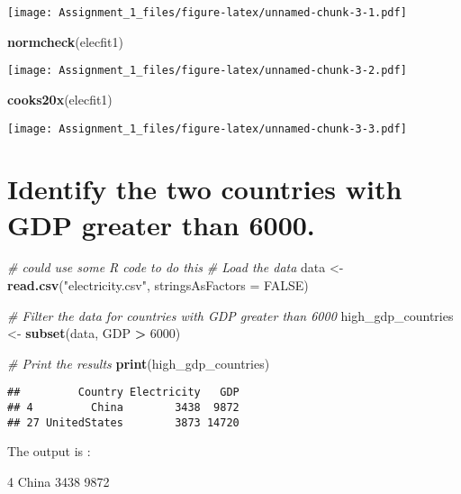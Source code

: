 \documentclass[
]{article}
\newenvironment{Shaded}{\begin{snugshade}}{\end{snugshade}}
\newcommand{\AttributeTok}[1]{\textcolor[rgb]{0.13,0.29,0.53}{#1}}
\newcommand{\CommentTok}[1]{\textcolor[rgb]{0.56,0.35,0.01}{\textit{#1}}}
\newcommand{\ConstantTok}[1]{\textcolor[rgb]{0.56,0.35,0.01}{#1}}
\newcommand{\DecValTok}[1]{\textcolor[rgb]{0.00,0.00,0.81}{#1}}
\newcommand{\FunctionTok}[1]{\textcolor[rgb]{0.13,0.29,0.53}{\textbf{#1}}}
\newcommand{\NormalTok}[1]{#1}
\newcommand{\OtherTok}[1]{\textcolor[rgb]{0.56,0.35,0.01}{#1}}
\newcommand{\SpecialCharTok}[1]{\textcolor[rgb]{0.81,0.36,0.00}{\textbf{#1}}}
\newcommand{\StringTok}[1]{\textcolor[rgb]{0.31,0.60,0.02}{#1}}
\begin{document}
\texttt{[image: Assignment\_1\_files/figure-latex/unnamed-chunk-3-1.pdf]}

\begin{Shaded}
\begin{Highlighting}[]
\FunctionTok{normcheck}\NormalTok{(elecfit1)}
\end{Highlighting}
\end{Shaded}

\texttt{[image: Assignment\_1\_files/figure-latex/unnamed-chunk-3-2.pdf]}

\begin{Shaded}
\begin{Highlighting}[]
\FunctionTok{cooks20x}\NormalTok{(elecfit1)}
\end{Highlighting}
\end{Shaded}

\texttt{[image: Assignment\_1\_files/figure-latex/unnamed-chunk-3-3.pdf]}

\section{Identify the two countries with GDP greater than
6000.}\label{identify-the-two-countries-with-gdp-greater-than-6000.}

\begin{Shaded}
\begin{Highlighting}[]
\CommentTok{\# could use some R code to do this}
\CommentTok{\# Load the data}
\NormalTok{data }\OtherTok{\textless{}{-}} \FunctionTok{read.csv}\NormalTok{(}\StringTok{"electricity.csv"}\NormalTok{, }\AttributeTok{stringsAsFactors =} \ConstantTok{FALSE}\NormalTok{)}

\CommentTok{\# Filter the data for countries with GDP greater than 6000}
\NormalTok{high\_gdp\_countries }\OtherTok{\textless{}{-}} \FunctionTok{subset}\NormalTok{(data, GDP }\SpecialCharTok{\textgreater{}} \DecValTok{6000}\NormalTok{)}

\CommentTok{\# Print the results}
\FunctionTok{print}\NormalTok{(high\_gdp\_countries)}
\end{Highlighting}
\end{Shaded}

\begin{verbatim}
##         Country Electricity   GDP
## 4         China        3438  9872
## 27 UnitedStates        3873 14720
\end{verbatim}

The output is :

4 China 3438 9872
\end{document}
